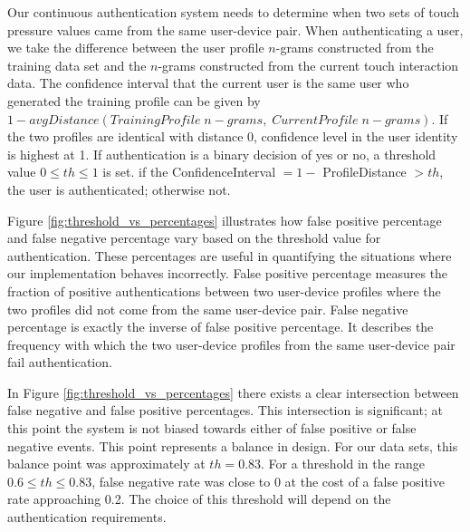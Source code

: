 \documentclass{acm_proc_article-sp}
\begin{document}
Our continuous authentication system needs to determine 
when two sets of touch pressure values came from the same user-device pair. 
When authenticating a user, we take the difference between
the user profile $n$-grams constructed from the training data set 
and the $n$-grams constructed from the current touch interaction data.
The confidence interval that the current user is the same 
user who generated the training profile can be given by 
$1 - avgDistance(TrainingProfile \; n-grams, \; CurrentProfile \; n-grams)$. 
If the two profiles are identical with distance 0, 
confidence level in the user identity is highest at 1.
%
If authentication is a binary decision of yes or no, a threshold value $0 \leq th \leq 1$ is set.
if the ConfidenceInterval $= 1 -$ ProfileDistance $> th$, the user is authenticated; otherwise not. 



Figure \ref{fig:threshold_vs_percentages} illustrates how false positive percentage
and false negative percentage vary based on the threshold value for authentication.
These percentages are useful in quantifying the situations where
our implementation behaves incorrectly.
False positive percentage measures the fraction of positive authentications 
between two user-device profiles where 
the two profiles did not come from the same user-device pair.
False negative percentage is exactly the inverse of false positive percentage.
It describes the frequency with which the two user-device profiles 
from the same user-device pair fail authentication.

In Figure \ref{fig:threshold_vs_percentages} there exists a clear intersection between false negative and false positive percentages. This intersection is significant; at this point the system is not biased towards
either of false positive or false negative events. This point represents a balance in design. For our
data sets, this balance point was approximately at $th=0.83$. For a threshold in the range
$0.6 \leq th \leq 0.83$, false negative rate was close to 0 at the cost of a false positive rate approaching 0.2.
The choice of this threshold will depend on the authentication requirements.
\end{document}
